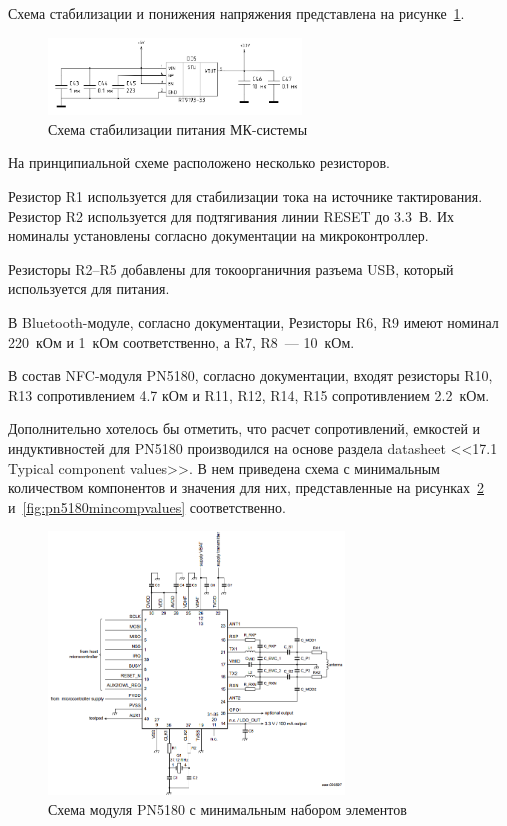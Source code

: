 Схема стабилизации и понижения напряжения представлена на рисунке~\ref{fig:mk_usb_stab}.

\begin{figure}[H]
    \centering
    \includegraphics[width=0.6\textwidth]{images/design/mk_usb_stab}
    \caption{\centering Схема стабилизации питания МК-системы}
    \label{fig:mk_usb_stab}
\end{figure}


На принципиальной схеме расположено несколько резисторов.

Резистор R1 используется для стабилизации тока на источнике тактирования.
Резистор R2 используется для подтягивания линии RESET до 3.3~В.
Их номиналы установлены согласно документации на микроконтроллер\cite{stm32f103_datasheet}.

Резисторы R2--R5 добавлены для токоорганичния разъема USB, который используется для питания.

В Bluetooth-модуле, согласно документации, Резисторы R6, R9 имеют номинал 220~кОм и 1~кОм соответственно, а R7, R8~--- 10~кОм.

В состав NFC-модуля PN5180, согласно документации, входят резисторы R10, R13 сопротивлением 4.7 кОм и R11, R12, R14, R15 сопротивлением 2.2~кОм.

Дополнительно хотелось бы отметить, что расчет сопротивлений, емкостей и индуктивностей для PN5180 производился на основе раздела datasheet <<17.1 Typical component values>>\cite{pn5180_datasheet}.
В нем приведена схема с минимальным количеством компонентов и значения для них, представленные на рисунках~\ref{fig:pn5180mincomp} и~\ref{fig:pn5180mincompvalues} соответственно.

\begin{figure}[H]
    \centering
    \includegraphics[width=0.7\textwidth]{images/design/pn5180mincomp}
    \caption{\centering Схема модуля PN5180 с минимальным набором элементов}
    \label{fig:pn5180mincomp}
\end{figure}

